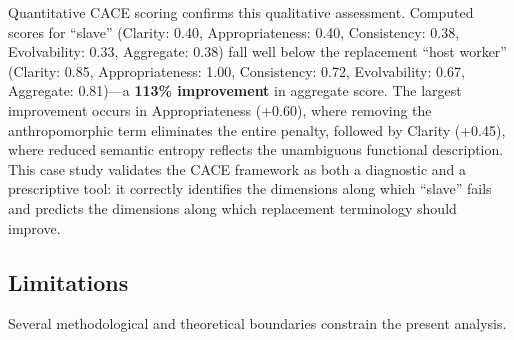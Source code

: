 \documentclass[
]{article}
\numberwithin{equation}{section}
\begin{document}
Quantitative CACE scoring confirms this qualitative assessment. Computed
scores for ``slave'' (Clarity: 0.40, Appropriateness: 0.40, Consistency:
0.38, Evolvability: 0.33, Aggregate: 0.38) fall well below the
replacement ``host worker'' (Clarity: 0.85, Appropriateness: 1.00,
Consistency: 0.72, Evolvability: 0.67, Aggregate: 0.81)---a
\textbf{113\% improvement} in aggregate score. The largest improvement
occurs in Appropriateness (+0.60), where removing the anthropomorphic
term eliminates the entire penalty, followed by Clarity (+0.45), where
reduced semantic entropy reflects the unambiguous functional
description. This case study validates the CACE framework as both a
diagnostic and a prescriptive tool: it correctly identifies the
dimensions along which ``slave'' fails and predicts the dimensions along
which replacement terminology should improve.

\subsection{Limitations}\label{limitations}

Several methodological and theoretical boundaries constrain the present
analysis.
\end{document}
